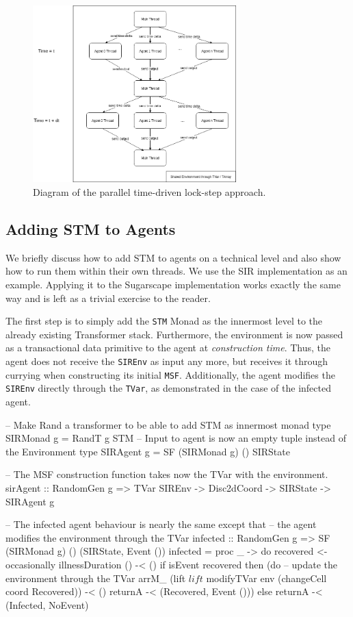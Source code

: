 \begin{figure}
	\centering
	\includegraphics[width=0.7\textwidth, angle=0]{./fig/concurrentabs/stm_abs.png}
	\caption[Diagram of the concurrent time-driven lock-step approach]{Diagram of the parallel time-driven lock-step approach.}
	\label{fig:stm_abs_structure}
\end{figure}

\subsection{Adding STM to Agents}
We briefly discuss how to add STM to agents on a technical level and also show how to run them within their own threads. We use the SIR implementation as an example. Applying it to the Sugarscape implementation works exactly the same way and is left as a trivial exercise to the reader.

The first step is to simply add the \texttt{STM} Monad as the innermost level to the already existing Transformer stack. Furthermore, the environment is now passed as a transactional data primitive to the agent at \textit{construction time}. Thus, the agent does not receive the \texttt{SIREnv} as input any more, but receives it through currying when constructing its initial \texttt{MSF}. Additionally, the agent modifies the \texttt{SIREnv} directly through the \texttt{TVar}, as demonstrated in the case of the infected agent.

\begin{HaskellCode}
-- Make Rand a transformer to be able to add STM as innermost monad
type SIRMonad g = RandT g STM
-- Input to agent is now an empty tuple instead of the Environment
type SIRAgent g = SF (SIRMonad g) () SIRState

-- The MSF construction function takes now the TVar with the environment.
sirAgent :: RandomGen g => TVar SIREnv -> Disc2dCoord -> SIRState -> SIRAgent g

-- The infected agent behaviour is nearly the same except that
-- the agent modifies the environment through the TVar
infected :: RandomGen g => SF (SIRMonad g) () (SIRState, Event ())
infected = proc _ -> do
  recovered <- occasionally illnessDuration () -< ()
  if isEvent recovered
    then (do
      -- update the environment through the TVar
      arrM_ (lift $ lift $ modifyTVar env (changeCell coord Recovered)) -< ()
      returnA -< (Recovered, Event ()))
    else returnA -< (Infected, NoEvent)
\end{HaskellCode}

